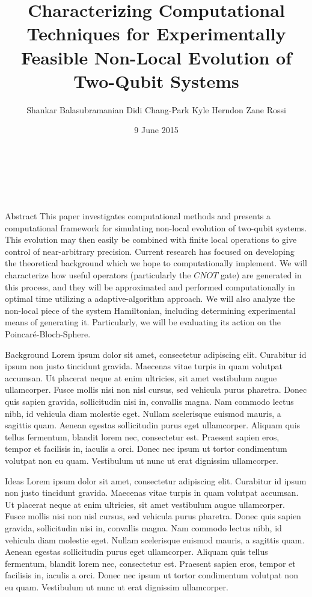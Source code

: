 \documentclass[12pt]{beamer}
\title{Characterizing Computational Techniques for Experimentally Feasible Non-Local Evolution of Two-Qubit Systems}
\author{Shankar Balasubramanian\hspace{1em} Didi Chang-Park\hspace{1em} Kyle Herndon\hspace{1em} Zane Rossi}
\institute{TJHSST Modern Physics and Optics Lab}
\date{9 June 2015}
\renewcommand{\maketitle}{%
	\begin{center}%
		\Huge\inserttitle\\[7mm]%
		\Large\insertauthor\\[5mm]%
		\Large\insertinstitute%
	\end{center}%
	\vspace*{-2ex}%
}
\begin{document}
\centering
	\begin{frame}{\maketitle}
		\begin{columns}
			\begin{column}{.45\textwidth}
				\begin{exampleblock}{Abstract}
					    This paper investigates computational methods and presents a computational framework for simulating non-local evolution of two-qubit systems. This evolution may then easily be combined with finite local operations to give control of near-arbitrary precision. Current research has focused on developing the theoretical background which we hope to computationally implement. We will characterize how useful operators (particularly the $CNOT$ gate) are generated in this process, and they will be approximated and performed computationally in optimal time utilizing a adaptive-algorithm approach. We will also analyze the non-local piece of the system Hamiltonian, including determining experimental means of generating it.  Particularly, we will be evaluating its action on the Poincar\'{e}-Bloch-Sphere.
				\end{exampleblock}
				\vspace{1em}
				\begin{exampleblock}{Background}
					Lorem ipsum dolor sit amet, consectetur adipiscing elit. Curabitur id ipsum non justo tincidunt gravida. Maecenas vitae turpis in quam volutpat accumsan. Ut placerat neque at enim ultricies, sit amet vestibulum augue ullamcorper. Fusce mollis nisi non nisl cursus, sed vehicula purus pharetra. Donec quis sapien gravida, sollicitudin nisi in, convallis magna. Nam commodo lectus nibh, id vehicula diam molestie eget. Nullam scelerisque euismod mauris, a sagittis quam. Aenean egestas sollicitudin purus eget ullamcorper. Aliquam quis tellus fermentum, blandit lorem nec, consectetur est. Praesent sapien eros, tempor et facilisis in, iaculis a orci. Donec nec ipsum ut tortor condimentum volutpat non eu quam. Vestibulum ut nunc ut erat dignissim ullamcorper.
				\end{exampleblock}
				\vspace{1em}
				\begin{block}{Ideas}
					Lorem ipsum dolor sit amet, consectetur adipiscing elit. Curabitur id ipsum non justo tincidunt gravida. Maecenas vitae turpis in quam volutpat accumsan. Ut placerat neque at enim ultricies, sit amet vestibulum augue ullamcorper. Fusce mollis nisi non nisl cursus, sed vehicula purus pharetra. Donec quis sapien gravida, sollicitudin nisi in, convallis magna. Nam commodo lectus nibh, id vehicula diam molestie eget. Nullam scelerisque euismod mauris, a sagittis quam. Aenean egestas sollicitudin purus eget ullamcorper. Aliquam quis tellus fermentum, blandit lorem nec, consectetur est. Praesent sapien eros, tempor et facilisis in, iaculis a orci. Donec nec ipsum ut tortor condimentum volutpat non eu quam. Vestibulum ut nunc ut erat dignissim ullamcorper.


\end{block}
\end{column}
\end{columns}
\end{frame}
\end{document}
